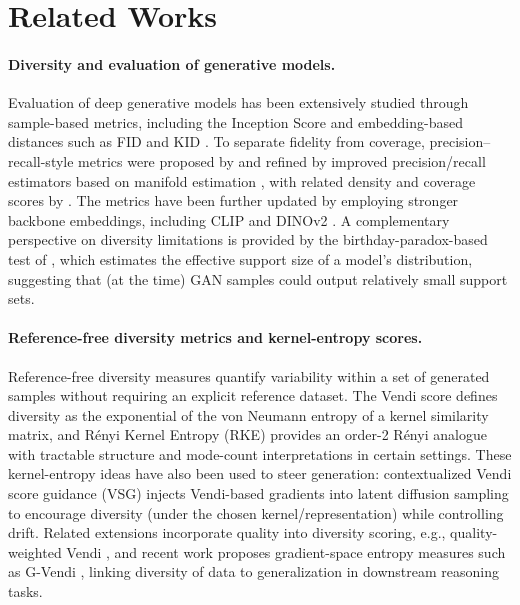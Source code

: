 \documentclass{article}
\theoremstyle{plain}
\theoremstyle{definition}
\begin{document}
\vspace{-3mm}
\section{Related Works}
\paragraph{Diversity and evaluation of generative models.}
Evaluation of deep generative models has been extensively studied through sample-based metrics, including the Inception Score \citep{salimans2016improved} and embedding-based distances such as FID \citep{heusel2017fid} and KID \citep{binkowski2018kid}. To separate fidelity from coverage, precision--recall-style metrics were proposed by \citet{sajjadi_assessing_2018} and refined by improved precision/recall estimators based on manifold estimation \citep{kynkaanniemi_improved_2019}, with related density and coverage scores by \citet{naeem2020reliable}. The metrics have been further updated by employing stronger backbone embeddings, including CLIP \citep{kynkaanniemi_role_2022} and DINOv2 \citep{stein_exposing_2023}. A complementary perspective on diversity limitations is provided by the birthday-paradox-based test of \citet{arora2018gans}, which estimates the effective support size of a model’s distribution, suggesting that (at the time) GAN samples could output relatively small support sets.  

\paragraph{Reference-free diversity metrics and kernel-entropy scores.}
Reference-free diversity measures quantify variability within a set of generated samples without requiring an explicit reference dataset. The Vendi score \citep{friedman2023vendi} defines diversity as the exponential of the von Neumann entropy of a kernel similarity matrix, and Rényi Kernel Entropy (RKE) \citep{jalali2023rke} provides an order-2 Rényi analogue with tractable structure and mode-count interpretations in certain settings. These kernel-entropy ideas have also been used to steer generation: contextualized Vendi score guidance (VSG) \citep{hemmat2024cvsg} injects Vendi-based gradients into latent diffusion sampling to encourage diversity (under the chosen kernel/representation) while controlling drift. Related extensions incorporate quality into diversity scoring, e.g., quality-weighted Vendi \citep{nguyen2024qwvendi}, and recent work proposes gradient-space entropy measures such as G-Vendi \citep{jung2025prismatic}, linking diversity of data to generalization in downstream reasoning tasks.
\end{document}
